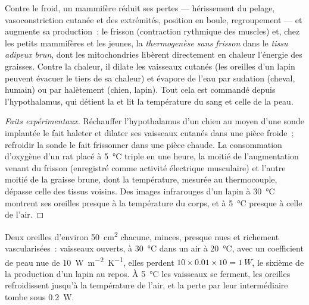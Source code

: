 \begin{proposition}\label{prop:b1:mammal-organization:thermoreg}
Contre le froid, un mammifère réduit ses pertes --- hérissement du
pelage, vasoconstriction cutanée et des extrémités, position en boule,
regroupement --- et augmente sa production~: le frisson (contraction
rythmique des muscles) et, chez les petits mammifères et les jeunes, la
\emph{thermogenèse sans frisson} dans
le \emph{tissu adipeux brun}, dont les
mitochondries libèrent directement en chaleur l'énergie des graisses.
Contre la chaleur, il dilate les vaisseaux cutanés (les oreilles d'un
lapin peuvent évacuer le tiers de sa chaleur) et évapore de l'eau par
sudation (cheval, humain) ou par halètement (chien, lapin). Tout cela
est commandé depuis l'hypothalamus, qui détient la  et
lit la température du sang et celle de la peau.
\end{proposition}
\begin{proof}[Faits expérimentaux]
Réchauffer l'hypothalamus d'un chien au moyen d'une sonde implantée le
fait haleter et dilater ses vaisseaux cutanés dans une pièce froide~;
refroidir la sonde le fait frissonner dans une pièce chaude. La
consommation d'oxygène d'un rat placé à \qty{5}{\celsius} triple en une
heure, la moitié de l'augmentation venant du frisson (enregistré comme
activité électrique musculaire) et l'autre moitié de la graisse brune,
dont la température, mesurée au thermocouple, dépasse celle des tissus
voisins. Des images infrarouges d'un lapin à \qty{30}{\celsius}
montrent ses oreilles presque à la température du corps, et à
\qty{5}{\celsius} presque à celle de l'air.
\end{proof}

\begin{example}\label{ex:b1:mammal-organization:ears}
Deux oreilles d'environ \qty{50}{cm^2} chacune, minces, presque nues et
richement vascularisées~: vaisseaux ouverts, à \qty{30}{\celsius} dans
un air à \qty{20}{\celsius}, avec un coefficient de peau nue de
\qty{10}{W.m^{-2}.K^{-1}}, elles perdent $10\times 0.01\times 10 =
\qty{1}{W}$, le sixième de la production d'un lapin au repos. À
\qty{5}{\celsius} les vaisseaux se ferment, les oreilles refroidissent
jusqu'à la température de l'air, et la perte par leur intermédiaire
tombe sous \qty{0.2}{W}.
\end{example}

